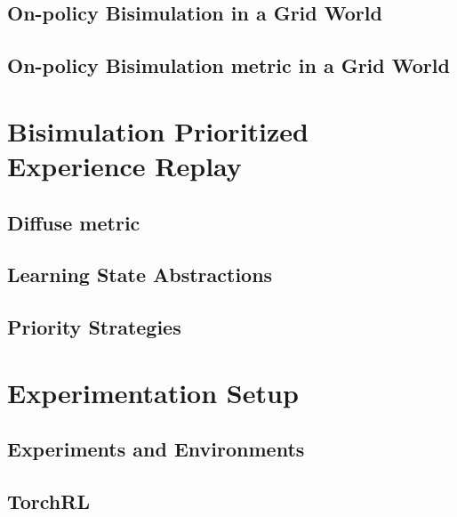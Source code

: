\subsection{On-policy Bisimulation in a Grid World}

\subsection{On-policy Bisimulation metric in a Grid World}


\section{Bisimulation Prioritized Experience Replay}

\subsection{Diffuse metric}
\subsection{Learning State Abstractions}
\subsection{Priority Strategies}


\section{Experimentation Setup}

\subsection{Experiments and Environments}
\subsection{TorchRL}
